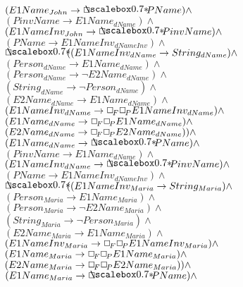 \documentclass[a4paper,10pt]{article}
\begin{document}
 $ (E1Name_{John} \rightarrow  \SVbox PName) \land $ \\ 
 $ (PinvName \rightarrow E1Name_{dName}) \land $ \\ 
 $ (E1NameInv_{John} \rightarrow  \SVbox PinvName) \land $ \\ 
 $ (PName \rightarrow E1NameInv_{dNameInv}) \land $ \\ 
 $  \SVbox ((E1NameInv_{dName} \rightarrow String_{dName}) \land $ \\ 
 $ (Person_{dName} \rightarrow E1Name_{dName}) \land $ \\ 
 $ (Person_{dName} \rightarrow  \lnot E2Name_{dName}) \land $ \\ 
 $ (String_{dName} \rightarrow  \lnot Person_{dName}) \land $ \\ 
 $ (E2Name_{dName} \rightarrow E1Name_{dName}) \land $ \\ 
 $ (E1NameInv_{dName} \rightarrow  \Box_{\!F}  \Box_{\!P} E1NameInv_{dName}) \land $ \\ 
 $ (E1Name_{dName} \rightarrow  \Box_{\!F}  \Box_{\!P} E1Name_{dName}) \land $ \\ 
 $ (E2Name_{dName} \rightarrow  \Box_{\!F}  \Box_{\!P} E2Name_{dName})) \land $ \\ 
 $ (E1Name_{dName} \rightarrow  \SVbox PName) \land $ \\ 
 $ (PinvName \rightarrow E1Name_{dName}) \land $ \\ 
 $ (E1NameInv_{dName} \rightarrow  \SVbox PinvName) \land $ \\ 
 $ (PName \rightarrow E1NameInv_{dNameInv}) \land $ \\ 
 $  \SVbox ((E1NameInv_{Maria} \rightarrow String_{Maria}) \land $ \\ 
 $ (Person_{Maria} \rightarrow E1Name_{Maria}) \land $ \\ 
 $ (Person_{Maria} \rightarrow  \lnot E2Name_{Maria}) \land $ \\ 
 $ (String_{Maria} \rightarrow  \lnot Person_{Maria}) \land $ \\ 
 $ (E2Name_{Maria} \rightarrow E1Name_{Maria}) \land $ \\ 
 $ (E1NameInv_{Maria} \rightarrow  \Box_{\!F}  \Box_{\!P} E1NameInv_{Maria}) \land $ \\ 
 $ (E1Name_{Maria} \rightarrow  \Box_{\!F}  \Box_{\!P} E1Name_{Maria}) \land $ \\ 
 $ (E2Name_{Maria} \rightarrow  \Box_{\!F}  \Box_{\!P} E2Name_{Maria})) \land $ \\ 
 $ (E1Name_{Maria} \rightarrow  \SVbox PName) \land $ \\ 
\end{document}
